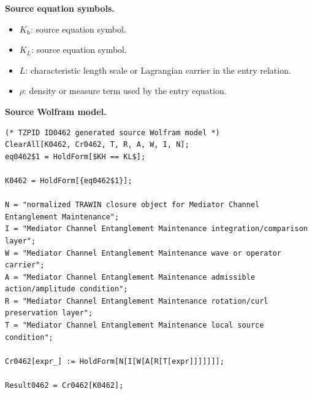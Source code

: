 \begin{minipage}[t]{0.49\linewidth}
\begingroup
\small
\raggedright
\textbf{Source equation symbols.}\par
\begin{itemize}[leftmargin=1.35em,itemsep=1pt,topsep=1pt,parsep=0pt]
    \item $K_{\mathrm{h}}$: source equation symbol.
    \item $K_{L}$: source equation symbol.
    \item $L$: characteristic length scale or Lagrangian carrier in the entry relation.
    \item $\rho$: density or measure term used by the entry equation.
\end{itemize}
\endgroup
\end{minipage}\hfill
\begin{minipage}[t]{0.47\linewidth}
\begingroup
\scriptsize
\raggedright
\textbf{Source Wolfram model.}\par
\begin{Verbatim}[fontsize=\tiny,breaklines=true,breakanywhere=true]
(* TZPID ID0462 generated source Wolfram model *)
ClearAll[K0462, Cr0462, T, R, A, W, I, N];
eq0462$1 = HoldForm[$KH == KL$];

K0462 = HoldForm[{eq0462$1}];

N = "normalized TRAWIN closure object for Mediator Channel Entanglement Maintenance";
I = "Mediator Channel Entanglement Maintenance integration/comparison layer";
W = "Mediator Channel Entanglement Maintenance wave or operator carrier";
A = "Mediator Channel Entanglement Maintenance admissible action/amplitude condition";
R = "Mediator Channel Entanglement Maintenance rotation/curl preservation layer";
T = "Mediator Channel Entanglement Maintenance local source condition";

Cr0462[expr_] := HoldForm[N[I[W[A[R[T[expr]]]]]]];

Result0462 = Cr0462[K0462];
\end{Verbatim}
\endgroup
\end{minipage}

